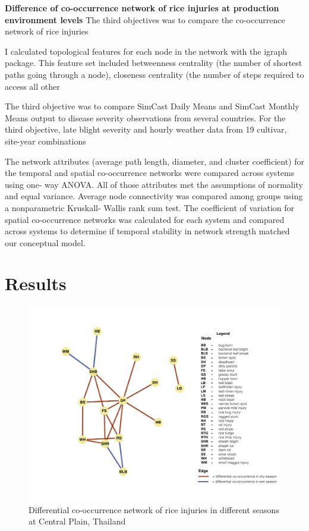 \textbf{Difference of co-occurrence network of rice injuries at production environment levels}
The third objectives was to compare the co-occurrence network of rice injuries

I calculated topological features for each node in the network with the igraph package. This feature set included betweenness centrality (the number of shortest paths going through a node), closeness centrality (the number of steps required to access all other 


The third objective was to compare SimCast Daily Means and SimCast Monthly Means output to disease severity observations from several countries. For the third objective, late blight severity and hourly weather data from 19 cultivar, site-year combinations 

The network attributes (average path length, diameter, and cluster coefficient) for the temporal and spatial co-occurrence networks were compared across systems using one- way ANOVA. All of those attributes met the assumptions of normality and equal variance. Average node connectivity was compared among groups using a nonparametric Kruskall- Wallis rank sum test. The coefficient of variation for spatial co-occurrence networks was calculated for each system and compared across systems to determine if temporal stability in network strength matched our conceptual model.

\section{Results}

\begin{figure}
\centering
\includegraphics[width = 1\textwidth]{figures/difseasonCP.pdf}
\caption{Differential co-occurrence network of rice injuries in different seasons at Central Plain, Thailand}
\label{fig:difseasonCP}
\end{figure} 

